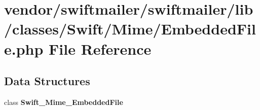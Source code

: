 \section{vendor/swiftmailer/swiftmailer/lib/classes/\+Swift/\+Mime/\+Embedded\+File.php File Reference}
\label{_mime_2_embedded_file_8php}
\subsection*{Data Structures}
\begin{DoxyCompactItemize}
\item 
class {\bf Swift\+\_\+\+Mime\+\_\+\+Embedded\+File}
\end{DoxyCompactItemize}
